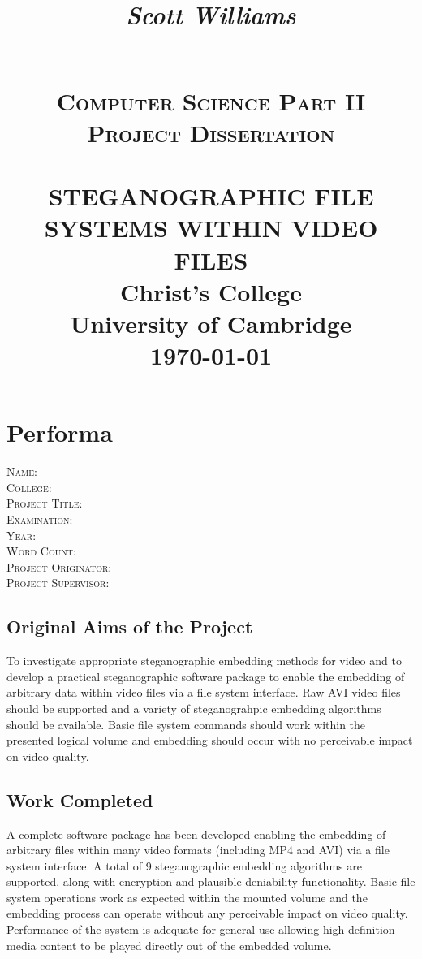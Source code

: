 \documentclass[paper=a4, fontsize=11pt,twoside]{scrartcl}    %
\title{
	\begin{flushright}
		\LARGE{\textit{Scott Williams}}
	\end{flushright}
	~\\[2.0cm]			
	\normalsize \textsc{Computer Science Part II Project Dissertation}\\[2.0cm]     %
    \HRule{0.5pt} \\                        %
    \LARGE \textbf{\uppercase{Steganographic file systems within video files}}    %
    \HRule{2pt} \\[30pt]        %
    \normalsize Christ's College\\[5pt]University of Cambridge\\[25pt]           
    \normalsize \today            %
}
\makeatletter
\def\printtitle{%
    {\centering \@title\par}}
\def\printauthor{%
    {\large \@author}}
\newcommand\blankpage{%
    \null
    \thispagestyle{empty}%
    \addtocounter{page}{-1}%
    \newpage}
\makeatother
\begin{document}
\renewcommand{\thelstlisting}{\thesection.\arabic{lstlisting}}
\thispagestyle{empty}        %

\printtitle                    %
\vfill
\printauthor                %
\afterpage{\blankpage}
\newpage
\setcounter{page}{1}        %
\section*{Performa}
\textsc{Name}: \\
\textsc{College}: \\
\textsc{Project Title}: \\
\textsc{Examination}: \\
\textsc{Year}: \\
\textsc{Word Count}: \\
\textsc{Project Originator}: \\
\textsc{Project Supervisor}: \\

\subsection*{Original Aims of the Project}
To investigate appropriate steganographic embedding methods for video and to develop a practical steganographic software package to enable the embedding of arbitrary data within video files via a file system interface. Raw AVI video files should be supported and a variety of steganograhpic embedding algorithms should be available. Basic file system commands should work within the presented logical volume and embedding should occur with no perceivable impact on video quality.

\subsection*{Work Completed}
A complete software package has been developed enabling the embedding of arbitrary files within many video formats (including MP4 and AVI) via a file system interface. A total of 9 steganographic embedding algorithms are supported, along with encryption and plausible deniability functionality. Basic file system operations work as expected within the mounted volume and the embedding process can operate without any perceivable impact on video quality. Performance of the system is adequate for general use allowing high definition media content to be played directly out of the embedded volume.
\end{document}
